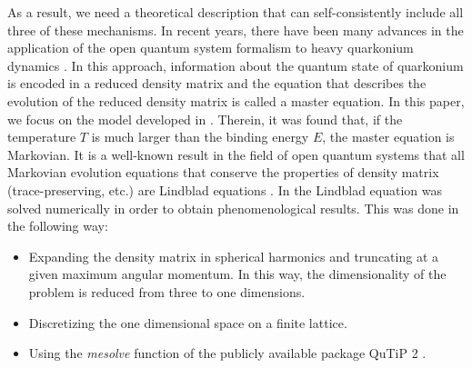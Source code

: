 \documentclass[times,sort&compress,final]{elsarticle}
\begin{document}
As a result, we need a theoretical description that can self-consistently include all three of these mechanisms.
In recent years, there have been many advances in the application of the open quantum system formalism to heavy quarkonium dynamics \cite{Borghini:2011ms,Akamatsu:2012vt,Akamatsu:2014qsa,Blaizot:2015hya,Katz:2015qja,Brambilla:2016wgg,Brambilla:2017zei,Kajimoto:2017rel,Blaizot:2017ypk,Akamatsu:2018xim,Yao:2018nmy,Yao:2018sgn,Blaizot:2018oev,Yao:2020eqy,Yao:2021lus}. 
In this approach, information about the quantum state of quarkonium is encoded in a reduced density matrix and the equation that describes the evolution of the reduced density matrix is called a master equation. 
In this paper, we focus on the model developed in \cite{Brambilla:2016wgg,Brambilla:2017zei}. 
Therein, it was found that, if the temperature $T$ is much larger than the binding energy $E$, the master equation is Markovian. 
It is a well-known result in the field of open quantum systems that all Markovian evolution equations that conserve the properties of density matrix (trace-preserving, etc.) are Lindblad equations \cite{Gorini:1975nb,Lindblad:1975ef}. 
In \cite{Brambilla:2016wgg,Brambilla:2017zei} the Lindblad equation was solved numerically in order to obtain phenomenological results. 
This was done in the following way:
\begin{itemize}
\item Expanding the density matrix in spherical harmonics and truncating at a given maximum angular momentum. In this way, the dimensionality of the problem is reduced from three to one dimensions.
\item Discretizing the one dimensional space on a finite lattice. 
\item Using the \textit{mesolve} function of the publicly available package QuTiP 2 \cite{qutip1,qutip2}.
\end{itemize}
\end{document}
